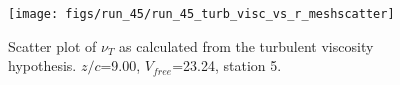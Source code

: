 \begin{figure}[H]
\centering
\texttt{[image: figs/run\_45/run\_45\_turb\_visc\_vs\_r\_meshscatter]}
\caption{Scatter plot of $\nu_T$ as calculated from the turbulent viscosity hypothesis. $z/c$=9.00, $V_{free}$=23.24, station 5.}
\label{fig:run_45_turb_visc_vs_r_meshscatter}
\end{figure}



